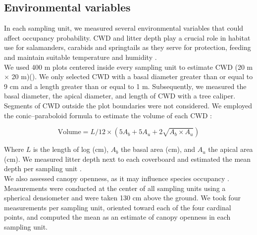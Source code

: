   \vspace{0.5cm}


\subsection*{Environmental variables}
\label{subsec:EnvVar}

In each sampling unit, we measured several environmental variables that could affect occupancy probability.
CWD and litter depth play a crucial role in habitat use for salamanders, carabids and springtails as
they serve for protection, feeding and maintain suitable temperature and humidity \citep{birdChangesSoilLitter2004,groverInfluenceCoverMoisture1998a,harmonEcologyCoarseWoody1986,koivula.LeafLitterSmallscale1999,mckennyEffectsStructuralComplexity2006,patrickEffectsExperimentalForestry2006a}. \\
We used 400 m plots centered inside every sampling unit to estimate CWD (20 m $\times$  20 m)(\citealp{methotGuideInventaireEchantillonnage2014}). 
We only selected CWD with a basal diameter greater than or equal to 9 cm and a length greater than or equal to 1 m.
Subsequently, we measured the basal diameter, the apical diameter, and length of CWD with a tree caliper.
Segments of CWD outside the plot boundaries were not considered.
We employed the conic–paraboloid formula to estimate the volume of each CWD \citep{fraverRefiningVolumeEstimates2007} :

\begin{equation}
  \text{Volume} = L/12 \times (5A_b + 5A_u + 2\sqrt{A_b \times A_u})
\end{equation}

\vspace{0.5cm}

Where $L$ is the length of log (cm), $A_b$ the basal area (cm), and $A_u$ the apical area (cm).
We measured litter depth next to each coverboard and estimated the mean depth per sampling unit \citep{mazerolleWoodlandSalamanderPopulation2021a}. \\
We also assessed canopy openness, as it may influence species occupancy \citep{henneronForestPlantCommunity2017,koivulaBorealCarabidbeetleColeoptera2002a,kotzeFortyYearsCarabid2011a,messereForestFloorDistribution1998,tilghmanMetaanalysisEffectsCanopy2012}.
Measurements were conducted at the center of all sampling units using a spherical densiometer \citep{lemmonSphericalDensiometerEstimating1956} and were taken 130 cm above the ground. 
We took four measurements per sampling unit, oriented toward each of the four cardinal points, and computed the mean as an estimate of canopy openness in each sampling unit.

